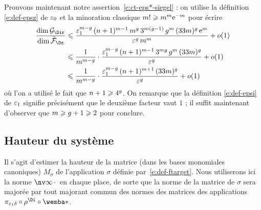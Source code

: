 Prouvons maintenant notre assertion~\eqref{e:ct-eps*-siegel} :
on utilise la définition \eqref{e:def-epsz} de \( \varepsilon\sb0 \) et la minoration
classique \( m! \geqslant m^m \mathrm e^{-m} \) pour écrire
\begin{align}
  \frac {\dim \ftarget} {\dim \fspace}
  & \le
  \frac {
    \epsi^{\puiss-\genre}
    \, (\dimp + 1)^{\puiss-1}
    \, \puiss ^{\genre}
    \, 3 ^{\puiss (\genre-1)}
    \, \genre^\puiss
    \, (33\puiss)^\genre
    \, \expb^\puiss
  }{
    \eps^\genre
    \, \puiss^\puiss
  }
  + o(1)
  \\ & \le
  \frac 1 { \puiss^{\puiss-\genre} }
  \cdot
  \frac {
    \epsi^{\puiss-\genre}
    \, (\dimp + 1)^{\puiss-1}
    \, 3 ^{\puiss \genre}
    \, \genre^\puiss
    \, (33\puiss)^\genre
  }{
    \eps^\genre
  }
  + o(1)
  \\ & \le
  \frac 1 { \puiss^{\puiss-\genre} }
  \cdot
  \frac {
    \epsi^{\puiss-\genre}
    \, (\dimp + 1)^{\puiss+1}
    \, (33\puiss)^\genre
  }{
    \eps^\genre
  }
  + o(1)
\end{align}
où l'on a utilisé le fait que \( n + 1 \geqslant 4^g \).  On remarque que
la définition \eqref{e:def-epsi} de \( \varepsilon\sb1 \) signifie précisément que le
deuxième facteur vaut \( 1 \) ; il suffit maintenant d'observer que \( m
  \geqslant g + 1 \geqslant 2 \) pour conclure.


\subsection{Hauteur du système}
\label{sec:siegel-ht}

Il s'agit d'estimer la hauteur de la matrice (dans les bases monomiales
canoniques) \( M_\sigma \) de l'application \( \sigma \) définie
par~\eqref{e:def-ftarget}. Nous utiliserons ici la norme \( \nv\infty\truc \)
en chaque place, de sorte que la norme de la matrice de \( \sigma \) sera
majorée par tout majorant commun des normes des matrices des applications
\( \pi_{\epsi\delta} \circ \rfull^{\Di} \circ \wemba* \).

